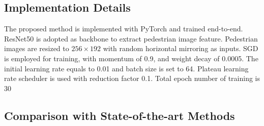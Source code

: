 \documentclass[runningheads]{llncs}
\begin{document}
\subsection{Implementation Details}
The proposed method is implemented with PyTorch and trained end-to-end. ResNet50 \cite{he2016deep} is adopted as backbone to extract pedestrian image feature. Pedestrian images are resized to $256 \times 192$ with random horizontal mirroring as inputs. SGD is employed for training, with momentum of 0.9, and weight decay of 0.0005. The initial learning rate equals to 0.01 and batch size is set to 64. Plateau learning rate scheduler is used with reduction factor 0.1. Total epoch number of training is 30

\subsection{Comparison with State-of-the-art Methods}
\end{document}
